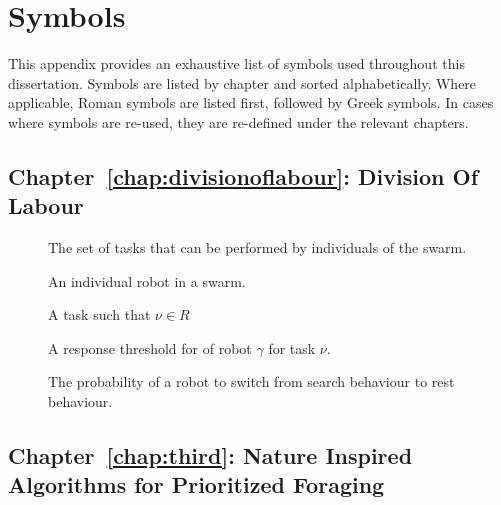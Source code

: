 
\chapter{Symbols}
\label{app:symbols}

This appendix provides an exhaustive list of symbols used throughout this dissertation.
Symbols are listed by chapter and sorted alphabetically. Where applicable, Roman
symbols are listed first, followed by Greek symbols. In cases where symbols are re-used,
they are re-defined under the relevant chapters.


\section{Chapter~\ref{chap:divisionoflabour}: Division Of Labour}
\label{sec:symbols:divisionoflabour}


\begin{description}
	\item[\parbox{\namewidth}{$R$}] The set of tasks that can be performed by individuals of the swarm.
	\item[\parbox{\namewidth}{$\gamma$}] An individual robot in a swarm.
	\item[\parbox{\namewidth}{$\nu$}] A task such that $\nu \in R$
	\item[\parbox{\namewidth}{$r_{\gamma,\nu}$}] A response threshold for of robot $\gamma$ for task $\nu$.
	\item[\parbox{\namewidth}{$z$}] The probability of a robot to switch from search behaviour to rest behaviour.
\end{description}



\section{Chapter~\ref{chap:third}: Nature Inspired Algorithms for Prioritized Foraging}
\label{sec:symbols:foraging}

